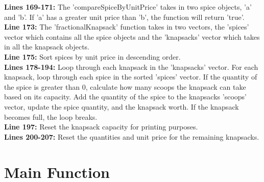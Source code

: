 \documentclass[letterpaper, 10pt,DIV=13]{scrartcl}
\numberwithin{equation}{section} %
\numberwithin{figure}{section} %
\numberwithin{table}{section} %
\begin{document}
\textbf{Lines 169-171:} The 'compareSpiceByUnitPrice' takes in two spice objects, 'a' and 'b'. If 'a' has a greater unit price than 'b', the function will return 'true'. \\
\textbf{Line 173:} The 'fractionalKnapsack' function takes in two vectors, the 'spices' vector which contains all the spice objects and the 'knapsacks' vector which takes in all the knapsack objects. \\
\textbf{Line 175:} Sort spices by unit price in descending order. \\
\textbf{Lines 178-194:} Loop through each knapsack in the 'knapsacks' vector. For each knapsack, loop through each spice in the sorted 'spices' vector. If the quantity of the spice is greater than 0, calculate how many scoops the knapsack can take based on its capacity. Add the quantity of the spice to the knapsacks 'scoops' vector, update the spice quantity, and the knapsack worth. If the knapsack becomes full, the loop breaks. \\
\textbf{Line 197:} Reset the knapsack capacity for printing purposes. \\
\textbf{Lines 200-207:} Reset the quantities and unit price for the remaining knapsacks.


\pagebreak

\section{Main Function}
\end{document}

